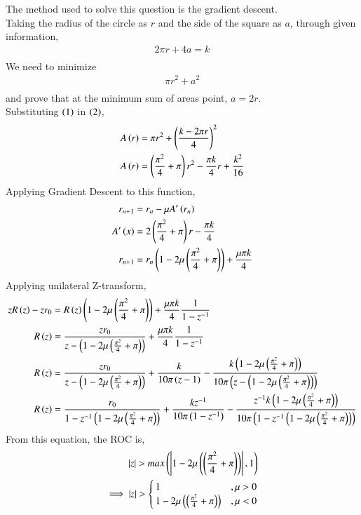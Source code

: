 \documentclass[journal]{IEEEtran}
\begin{document}
The method used to solve this question is the gradient descent.\\
Taking the radius of the circle as $r$ and the side of the square as $a$, through given information,
\begin{align}
	2\pi r + 4a = k\\
\end{align}
We need to minimize
\begin{align}
	\pi r^2 + a^2\\
\end{align}
and prove that at the minimum sum of areas point, $a = 2r$.\\
Substituting $\left(1\right)$ in $\left(2\right)$,
\begin{align}
	A\left(r\right) &= \pi r^2 + \left(\frac{k - 2\pi r}{4}\right)^2\\
	A\left(r\right) &= \left(\frac{\pi^2}{4} + \pi\right)r^2 - \frac{\pi k}{4}r + \frac{k^2}{16}
\end{align}
Applying Gradient Descent to this function,
\begin{align}
	r_{n+1} &= r_n - \mu A^\prime\left(r_n\right)\\
	A^\prime\left(x\right) &= 2\left(\frac{\pi^2}{4} + \pi\right)r - \frac{\pi k}{4}\\
	r_{n+1} &= r_n\left(1 - 2\mu\left(\frac{\pi^2}{4} + \pi\right)\right) + \frac{\mu\pi k}{4}
\end{align}
Applying unilateral Z-transform,
\begin{align}
	zR\left(z\right) - zr_0 &= R\left(z\right)\left(1 - 2\mu\left(\frac{\pi^2}{4} + \pi\right)\right) + \frac{\mu\pi k}{4} \frac{1}{1 - z^{-1}}\\
	R\left(z\right) &= \frac{zr_0}{z - \left(1 - 2\mu\left(\frac{\pi^2}{4} + \pi\right)\right)} + \frac{\mu\pi k}{4} \frac{1}{1 - z^{-1}}\\
	R\left(z\right) &= \frac{zr_0}{z - \left(1 - 2\mu\left(\frac{\pi^2}{4} + \pi\right)\right)} + \frac{k}{10 \pi \left(z - 1\right)} - \frac{k \left(1 - 2\mu\left(\frac{\pi^2}{4} + \pi\right)\right)}{10 \pi \left(z - \left(1 - 2\mu\left(\frac{\pi^2}{4} + \pi\right)\right)\right)}\\
	R\left(z\right) &= \frac{r_0}{1 - z^{-1}\left(1 - 2\mu\left(\frac{\pi^2}{4} + \pi\right)\right)} + \frac{kz^{-1}}{10 \pi \left(1 - z^{-1}\right)} - \frac{z^{-1}k \left(1 - 2\mu\left(\frac{\pi^2}{4} + \pi\right)\right)}{10 \pi \left(1 - z^{-1}\left(1 - 2\mu\left(\frac{\pi^2}{4} + \pi\right)\right)\right)}\\
\end{align}
From this equation, the ROC is,
\begin{align}
	\left\vert z\right\vert > max\left(\left\vert1 - 2\mu\left(\left(\frac{\pi^2}{4} + \pi\right)\right)\right\vert,1\right)\\
	\implies \left\vert z\right\vert >
	\begin{cases}
		1 &, \mu > 0\\
		1 - 2\mu\left(\left(\frac{\pi^2}{4} + \pi\right)\right) &, \mu < 0\\
	\end{cases}
\end{align}
\end{document}
